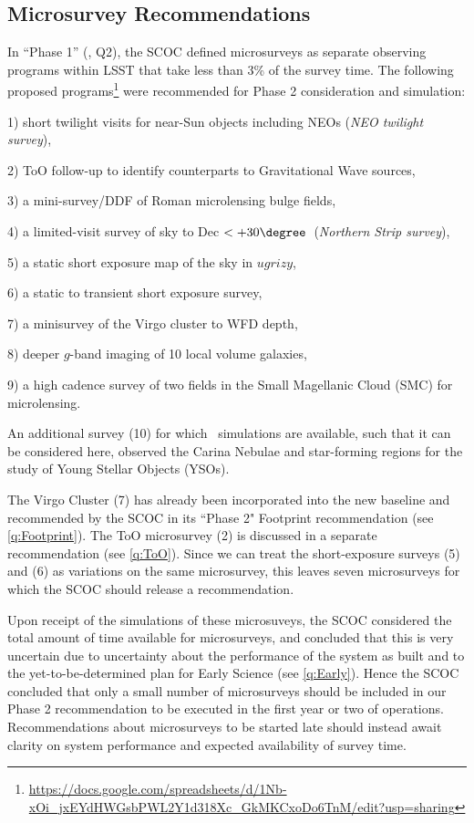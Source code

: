 \subsection{Microsurvey Recommendations}\label{q:Micro}


In ``Phase 1'' (, Q2), the SCOC  defined microsurveys as separate observing programs within LSST that take less than 3\% of the survey time. The following proposed programs\footnote{\url{https://docs.google.com/spreadsheets/d/1Nb-xOi_jxEYdHWGsbPWL2Y1d318Xc_GkMKCxoDo6TnM/edit?usp=sharing}} were recommended for Phase 2 consideration and simulation:

1) short twilight visits for near-Sun objects including NEOs (\emph{NEO twilight survey}), 

2) ToO follow-up to identify counterparts to Gravitational Wave sources, 

3) a mini-survey/DDF of Roman microlensing bulge fields,

4) a limited-visit survey of sky to Dec $< +30\degree $~(\emph{Northern Strip survey}),

5) a static short exposure map of the sky in $ugrizy$,

6) a static to transient short exposure survey, 

7) a minisurvey of the Virgo cluster to WFD depth, 

8) deeper $g$-band imaging of 10 local volume galaxies,

9) a high cadence survey of two fields in the Small Magellanic Cloud (SMC) for microlensing. 

An additional survey (10) for which \opsim\ simulations are available, such that it can be considered here, observed the Carina Nebulae and star-forming regions for the study of Young Stellar Objects (YSOs).  

The Virgo Cluster (7) has already been incorporated into the new baseline and recommended by the SCOC in its ``Phase 2" Footprint recommendation (see \autoref{q:Footprint}). The ToO microsurvey (2) is discussed in a separate recommendation (see \autoref{q:ToO}). 
Since we can treat the short-exposure surveys (5) and (6) as variations on the same microsurvey, this leaves seven microsurveys for which the SCOC should release a recommendation.

Upon receipt of the simulations of these microsuveys, the SCOC considered the total amount of time available for microsurveys, and concluded that this is very uncertain due to uncertainty about the performance of the system as built and to the yet-to-be-determined plan for Early Science (see \autoref{q:Early}). Hence the SCOC concluded that only a small number of microsurveys should be included in our Phase 2 recommendation to be executed in the first year or two of operations. Recommendations about microsurveys to be started late should instead await clarity on system performance and expected availability of survey time. 

